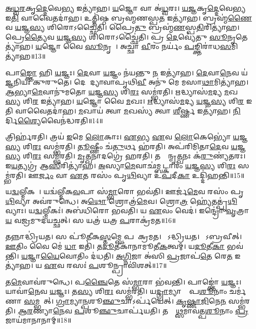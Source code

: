 \ul{𑌅}\ul{𑌧𑍍𑌵}\ul{𑌰}𑌕𑍃\ul{𑌦𑍍𑌦𑍇}𑌵𑍇\ul{𑌭𑍍𑌯} 𑌇𑌤𑍍𑌯𑌾॑𑌹। 
\ul{𑌯}𑌜𑍍𑌞𑍋 𑌵𑌾 𑌅॑\ul{𑌧𑍍𑌵}𑌰𑌃। 
\ul{𑌯}\ul{𑌜𑍍𑌞}𑌕𑍃\ul{𑌦𑍍𑌦𑍇}𑌵𑍇\ul{𑌭𑍍𑌯} 𑌇\ul{𑌤𑌿} 𑌵𑌾𑌵𑍈𑌤𑌦𑌾॑𑌹। 
𑌉𑌤𑍍𑌤𑌿॑𑌷𑍍𑌠 𑌬𑍍𑌰𑌹𑍍𑌮𑌣𑌸𑍍𑌪\ul{𑌤} 𑌇𑌤𑍍𑌯𑌾॑𑌹। 
𑌬𑍍𑌰𑌹𑍍𑌮॑\ul{𑌣𑍈}𑌵 \ul{𑌯}𑌜𑍍𑌞\ul{𑌸𑍍𑌯} 𑌶𑌿𑌰𑍋𑌽𑌚𑍍𑌛𑍈॑𑌤𑌿। 
𑌪𑍍𑌰𑍈\ul{𑌤𑍁} 𑌬𑍍𑌰𑌹𑍍𑌮॑\ul{𑌣}𑌸𑍍𑌪\ul{𑌤𑌿}𑌰𑌿𑌤𑍍𑌯𑌾॑𑌹। 
𑌪𑍍𑌰𑍇\ul{𑌤𑍍𑌯𑍈}𑌵 \ul{𑌯}𑌜𑍍𑌞\ul{𑌸𑍍𑌯} 𑌶𑌿𑌰𑍋𑌽𑌚𑍍𑌛𑍈॑𑌤𑌿। 
𑌪𑍍𑌰 \ul{𑌦𑍇}𑌵𑍍𑌯𑍇॑𑌤𑍁 \ul{𑌸𑍂}𑌨𑍃𑌤𑍇𑌤𑍍𑌯𑌾॑𑌹। 
\ul{𑌯}𑌜𑍍𑌞𑍋 𑌵𑍈 \ul{𑌸𑍂}𑌨𑍃𑌤𑌾᳚। 
𑌅𑌚𑍍𑌛𑌾॑ \ul{𑌵𑍀}𑌰𑌂 𑌨𑌰𑍍𑌯𑌂॑ \ul{𑌪}𑌙𑍍𑌕𑍍𑌤𑌿𑌰𑌾॑𑌧\ul{𑌸}𑌮𑌿𑌤𑍍𑌯𑌾॑𑌹॥13॥

𑌪𑌾\ul{𑌙𑍍𑌕𑍍𑌤𑍋} 𑌹𑌿 \ul{𑌯}𑌜𑍍𑌞𑌃। 
\ul{𑌦𑍇}𑌵𑌾 \ul{𑌯}𑌜𑍍𑌞𑌂 𑌨॑𑌯𑌨𑍍𑌤𑍁 \ul{𑌨} 𑌇𑌤𑍍𑌯𑌾॑𑌹। 
\ul{𑌦𑍇}𑌵𑌾\ul{𑌨𑍇}𑌵 𑌯॑\ul{𑌜𑍍𑌞}𑌨𑌿𑌯𑌃॑ 𑌕𑍁𑌰𑍁𑌤𑍇। 
𑌦𑍇𑌵𑍀᳚ 𑌦𑍍𑌯𑌾𑌵𑌾𑌪𑍃𑌥𑌿\ul{𑌵𑍀} 𑌅𑌨𑍁॑ 𑌮𑍇 𑌮𑌸𑌾\ul{𑌥𑌾}𑌮𑌿𑌤𑍍𑌯𑌾॑𑌹। 
\ul{𑌆}𑌭𑍍𑌯𑌾\ul{𑌮𑍇}𑌵𑌾𑌨𑍁॑𑌮𑌤𑍋 \ul{𑌯}𑌜𑍍𑌞\ul{𑌸𑍍𑌯} 𑌶𑌿\ul{𑌰𑌃} 𑌸𑌮𑍍𑌭॑𑌰𑌤𑌿। 
\ul{𑌋}𑌦𑍍𑌧𑍍𑌯𑌾𑌸॑\ul{𑌮}𑌦𑍍𑌯 \ul{𑌮}𑌖\ul{𑌸𑍍𑌯} 𑌶𑌿\ul{𑌰} 𑌇𑌤𑍍𑌯𑌾॑𑌹। 
\ul{𑌯}𑌜𑍍𑌞𑍋 𑌵𑍈 \ul{𑌮}𑌖𑌃। 
\ul{𑌋}𑌦𑍍𑌧𑍍𑌯𑌾𑌸॑\ul{𑌮}𑌦𑍍𑌯 \ul{𑌯}𑌜𑍍𑌞\ul{𑌸𑍍𑌯} 𑌶𑌿\ul{𑌰} 𑌇𑌤𑌿 𑌵𑌾𑌵𑍈𑌤𑌦𑌾॑𑌹। 
\ul{𑌮}𑌖𑌾𑌯॑ 𑌤𑍍𑌵𑌾 \ul{𑌮}𑌖𑌸𑍍𑌯॑ 𑌤𑍍𑌵𑌾 \ul{𑌶𑍀}𑌰𑍍𑌷𑍍𑌣 𑌇𑌤𑍍𑌯𑌾॑𑌹। 
\ul{𑌨𑌿}𑌰𑍍𑌦𑌿\ul{𑌶𑍍𑌯𑍈}𑌵𑍈𑌨॑𑌦𑍍𑌧𑌰𑌤𑌿॥14॥

𑌤𑍍𑌰𑌿𑌰𑍍\mbox{}𑌹॑𑌰𑌤𑌿। 
𑌤𑍍𑌰𑌯॑ \ul{𑌇}𑌮𑍇 \ul{𑌲𑍋}𑌕𑌾𑌃। 
\ul{𑌏}𑌭𑍍𑌯 \ul{𑌏}𑌵 \ul{𑌲𑍋}𑌕𑍇𑌭𑍍𑌯𑍋॑ \ul{𑌯}𑌜𑍍𑌞\ul{𑌸𑍍𑌯} 𑌶𑌿\ul{𑌰𑌃} 𑌸𑌮𑍍𑌭॑𑌰𑌤𑌿। 
\ul{𑌤𑍂}𑌷𑍍𑌣𑍀𑌂 𑌚॑\ul{𑌤𑍁}𑌰𑍍𑌥 𑌹॑𑌰𑌤𑌿। 
𑌅𑌪॑𑌰𑌿𑌮𑌿𑌤𑌾\ul{𑌦𑍇}𑌵 \ul{𑌯}𑌜𑍍𑌞\ul{𑌸𑍍𑌯} 𑌶𑌿\ul{𑌰𑌃} 𑌸𑌮𑍍𑌭॑𑌰𑌤𑌿। 
\ul{𑌮𑍃}\ul{𑌤𑍍𑌖}𑌨𑌾𑌦𑌗𑍍𑌰𑍇॑ 𑌹𑌰𑌤𑌿। 
𑌤𑌸𑍍𑌮𑌾᳚𑌨𑍍𑌮𑍃\ul{𑌤𑍍𑌖}𑌨𑌃 𑌕॑\ul{𑌰𑍁}𑌣𑍍𑌯॑𑌤𑌰𑌃। 
𑌇\ul{𑌯}𑌤𑍍𑌯𑌗𑍍𑌰॑ 𑌆\ul{𑌸𑍀}𑌰𑌿𑌤𑍍𑌯𑌾॑𑌹। 
\ul{𑌅}𑌸𑍍𑌯𑌾\ul{𑌮𑍇}𑌵𑌾𑌛॑𑌮𑍍𑌬𑌟𑍍𑌕𑌾𑌰𑌂 \ul{𑌯}𑌜𑍍𑌞\ul{𑌸𑍍𑌯} 𑌶𑌿\ul{𑌰𑌃} 𑌸𑌮𑍍𑌭॑𑌰𑌤𑌿। 
𑌊\ul{𑌰𑍍𑌜𑌂} 𑌵𑌾 \ul{𑌏}𑌤 𑌰𑌸𑌂॑ 𑌪𑍃\ul{𑌥𑌿}𑌵𑍍𑌯𑌾 𑌉॑\ul{𑌪}𑌦𑍀\ul{𑌕𑌾} 𑌉𑌦𑍍𑌦𑌿॑𑌹𑌨𑍍𑌤𑌿॥15॥

𑌯\ul{𑌦𑍍𑌵}𑌲𑍍𑌮𑍀𑌕𑌮𑍍᳚। 
𑌯𑌦𑍍𑌵॑𑌲𑍍𑌮𑍀𑌕\ul{𑌵}𑌪𑌾 𑌸॑\ul{𑌮𑍍𑌭𑌾}𑌰𑍋 𑌭𑌵॑𑌤𑌿। 
𑌊𑌰𑍍𑌜॑\ul{𑌮𑍇}𑌵 𑌰𑌸𑌂॑ 𑌪𑍃\ul{𑌥𑌿}𑌵𑍍𑌯𑌾 𑌅𑌵॑𑌰𑍁𑌨𑍍𑌧𑍇। 
𑌅\ul{𑌥𑍋} 𑌶𑍍𑌰𑍋𑌤𑍍𑌰॑\ul{𑌮𑍇}𑌵। 
𑌶𑍍𑌰𑍋\ul{𑌤𑍍𑌰}\ul{} 𑌹𑍍𑌯𑍇॑𑌤𑌤𑍍𑌪𑍃॑\ul{𑌥𑌿}𑌵𑍍𑌯𑌾𑌃। 
𑌯\ul{𑌦𑍍𑌵}𑌲𑍍𑌮𑍀𑌕𑌃॑। 
𑌅𑌬॑𑌧𑌿𑌰𑍋 𑌭𑌵𑌤𑌿। 
𑌯 \ul{𑌏}𑌵𑌂 𑌵𑍇𑌦॑। 
𑌇𑌨𑍍𑌦𑍍𑌰𑍋॑ \ul{𑌵𑍃}𑌤𑍍𑌰𑌾\ul{𑌯} 𑌵\ul{𑌜𑍍𑌰}𑌮𑍁𑌦॑𑌯𑌚𑍍𑌛𑌤𑍍। 
𑌸 𑌯𑌤𑍍𑌰॑ 𑌯𑌤𑍍𑌰 \ul{𑌪}𑌰𑌾𑌕𑍍𑌰॑𑌮𑌤॥16॥

𑌤𑌨𑍍𑌨𑌾𑌦𑍍𑌧𑍍𑌰𑌿॑𑌯𑌤। 
𑌸 𑌪𑍂॑𑌤𑍀𑌕\ul{𑌸𑍍𑌤}𑌮𑍍𑌬𑍇 𑌪𑌰𑌾᳚𑌕𑍍𑌰𑌮𑌤। 
𑌸𑍋᳚𑌽𑌦𑍍𑌧𑍍𑌰𑌿𑌯𑌤। 
𑌸𑍋᳚𑌽𑌬𑍍𑌰𑌵𑍀𑌤𑍍। 
\ul{𑌊}𑌤𑌿𑌂 𑌵𑍈 𑌮𑍇॑ \ul{𑌧𑌾} 𑌇𑌤𑌿॑। 
𑌤\ul{𑌦𑍂}𑌤𑍀𑌕𑌾॑𑌨𑌾𑌮𑍂𑌤𑍀\ul{𑌕}𑌤𑍍𑌵𑌮𑍍। 
𑌯\ul{𑌦𑍂}𑌤𑍀\ul{𑌕𑌾} 𑌭𑌵॑𑌨𑍍𑌤𑌿। 
\ul{𑌯}𑌜𑍍𑌞𑌾\ul{𑌯𑍈}𑌵𑍋𑌤𑌿𑌂 𑌦॑𑌧𑌤𑌿। 
\ul{𑌅}\ul{𑌗𑍍𑌨𑌿}𑌜𑌾 𑌅॑𑌸𑌿 \ul{𑌪𑍍𑌰}𑌜𑌾𑌪॑\ul{𑌤𑍇} 𑌰𑍇\ul{𑌤} 𑌇𑌤𑍍𑌯𑌾॑𑌹। 
𑌯 \ul{𑌏}𑌵 𑌰𑌸𑌃॑ \ul{𑌪}𑌶𑍂𑌨𑍍𑌪𑍍𑌰𑌾𑌵𑌿॑𑌶𑌤𑍍॥17॥

𑌤\ul{𑌮𑍇}𑌵𑌾𑌵॑𑌰𑍁𑌨𑍍𑌧𑍇। 
𑌪\ul{𑌞𑍍𑌚𑍈}𑌤𑍇 𑌸॑\ul{𑌮𑍍𑌭𑌾}𑌰𑌾 𑌭॑𑌵𑌨𑍍𑌤𑌿। 
𑌪𑌾𑌙𑍍𑌕𑍍𑌤𑍋॑ \ul{𑌯}𑌜𑍍𑌞𑌃। 
𑌯𑌾𑌵𑌾॑\ul{𑌨𑍇}𑌵 \ul{𑌯}𑌜𑍍𑌞𑌃। 
𑌤\ul{𑌸𑍍𑌯} 𑌶𑌿\ul{𑌰𑌃} 𑌸𑌮𑍍𑌭॑𑌰𑌤𑌿। 
𑌯\ul{𑌦𑍍𑌗𑍍𑌰𑌾}𑌮𑍍𑌯𑌾𑌣𑌾𑌂᳚ 𑌪\ul{𑌶𑍂}𑌨𑌾𑌂 𑌚𑌰𑍍𑌮॑𑌣𑌾 \ul{𑌸}𑌮𑍍𑌭𑌰𑍇᳚𑌤𑍍। 
\ul{𑌗𑍍𑌰𑌾}𑌮𑍍𑌯𑌾\ul{𑌨𑍍𑌪}𑌶𑍂\ul{𑌞𑍍𑌛𑍁}𑌚𑌾𑌽𑌰𑍍𑌪॑𑌯𑍇𑌤𑍍। 
\ul{𑌕𑍃}\ul{𑌷𑍍𑌣𑌾}\ul{𑌜𑌿}𑌨𑍇\ul{𑌨} 𑌸𑌮𑍍𑌭॑𑌰𑌤𑌿। 
\ul{𑌆}\ul{𑌰}𑌣𑍍𑌯𑌾\ul{𑌨𑍇}𑌵 \ul{𑌪}𑌶𑍂\ul{𑌞𑍍𑌛𑍁}𑌚𑌾𑌰𑍍𑌪॑𑌯𑌤𑌿। 
𑌤𑌸𑍍𑌮𑌾᳚\ul{𑌥𑍍𑌸}𑌮𑌾𑌵॑𑌤𑍍𑌪\ul{𑌶𑍂}𑌨𑌾𑌂 \ul{𑌪𑍍𑌰}𑌜𑌾𑌯॑𑌮𑌾𑌨𑌾𑌨𑌾𑌮𑍍॥18॥

